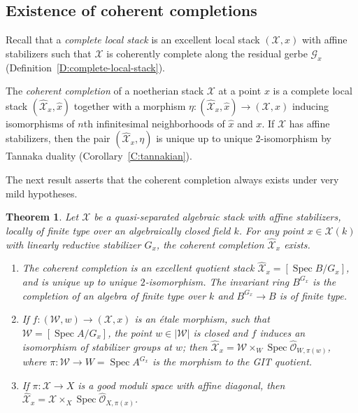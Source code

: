 \documentclass[a4paper]{amsart}
\theoremstyle{plain}
\newtheorem{theorem}{Theorem}[section]
\theoremstyle{definition}
\theoremstyle{remark}
\numberwithin{equation}{section}
\newcommand\cG{\mathcal{G}}
\newcommand\cW{\mathcal{W}}
\newcommand\cX{\mathcal{X}}
\newcommand\oh{\mathcal{O}}
\newcommand\co{\colon}
\DeclareMathOperator{\Spec}{Spec}
\renewcommand{\hat}{\widehat}
\begin{document}
\subsection{Existence of coherent completions}  \label{A:coherent-completion}
Recall that a \emph{complete local stack} is an excellent local stack $(\cX,x)$
with affine stabilizers such that $\cX$ is coherently complete along the
residual gerbe $\cG_x$ (Definition~\ref{D:complete-local-stack}).

The \emph{coherent completion} of a noetherian stack $\cX$ at a point $x$
is a complete local stack $(\hat{\cX}_x,\hat{x})$ together with a morphism $\eta\colon (\hat{\cX}_x,\hat{x}) \to (\cX,x)$ inducing isomorphisms of $n$th infinitesimal neighborhoods of $\hat{x}$ and $x$. If $\cX$ has affine stabilizers, then the pair $(\hat{\cX}_x,\eta)$ is unique up to unique $2$-isomorphism by Tannaka duality (Corollary~\ref{C:tannakian}).

The next 
result asserts that the coherent completion always exists under very mild hypotheses.  

\begin{theorem} \label{T:complete}
Let $\cX$ be a quasi-separated algebraic stack with affine stabilizers, locally of finite type over an algebraically closed field $k$. For any point $x \in \cX(k)$ with linearly reductive stabilizer $G_x$, the coherent completion $\hat{\cX}_x$ exists.
\begin{enumerate}
  \item \label{T:complete:excellent}
    The coherent completion is an excellent quotient stack
    $\hat{\cX}_x=[\Spec B/G_x]$, and is
    unique up to unique $2$-isomorphism. The invariant ring $B^{G_x}$ is
    the completion of an algebra of finite type over $k$ and $B^{G_x}\to B$
    is of finite type.
  \item \label{T:complete:etale-pres}
    If $f \co (\cW, w) \to (\cX,x)$ is an \'etale morphism, such that $\cW=[\Spec A/G_x]$, the point $w\in |\cW|$ is closed and $f$ induces an isomorphism of stabilizer groups at $w$; then $\hat{\cX}_x = \cW \times_W \Spec \hat{\oh}_{W,\pi(w)}$, where $\pi \co \cW \to W = \Spec A^{G_x}$ is the morphism to the GIT quotient.
  \item \label{T:complete:gms}
	If $\pi \co \cX \to X$ is a good moduli space with affine diagonal, then $\hat{\cX}_x = \cX \times_X \Spec \hat{\oh}_{X,\pi(x)}$.
\end{enumerate}
\end{theorem}
\end{document}
